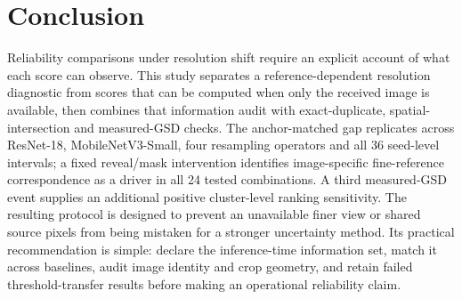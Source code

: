\section{Conclusion}

Reliability comparisons under resolution shift require an explicit account of
what each score can observe. This study separates a reference-dependent
resolution diagnostic from scores that can be computed when only the received
image is available, then combines that information audit with exact-duplicate,
spatial-intersection and measured-GSD checks. The anchor-matched gap replicates
across ResNet-18, MobileNetV3-Small, four resampling operators and all 36
seed-level intervals; a fixed reveal/mask intervention identifies
image-specific fine-reference correspondence as a driver in all 24 tested
combinations. A third measured-GSD event supplies an additional
positive cluster-level ranking sensitivity. The resulting protocol is
designed to prevent an unavailable finer view or shared source pixels from
being mistaken for a stronger uncertainty method. Its practical recommendation
is simple: declare the inference-time information set, match it across
baselines, audit image identity and crop geometry, and retain failed
threshold-transfer results before making an operational reliability claim.
